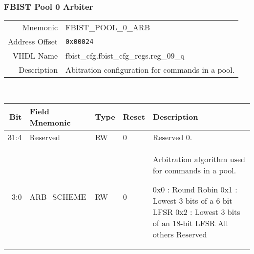 \subsubsection{FBIST Pool 0 Arbiter}
\begin{tabular}{ r | p{350px} }
  Mnemonic       & FBIST\_POOL\_0\_ARB                     \\
  Address Offset & \texttt{0x00024}                        \\
  VHDL Name      &  fbist\_cfg.fbist\_cfg\_regs.reg\_09\_q \\ \hline

  Description &
  Abitration configuration for commands in a pool. \\
\end{tabular}
\\
\begin{tabularx}{\textwidth}{r|l|l|l|X}
  \hline
  Bit   & Field Mnemonic & Type & Reset & Description \\ \hline

  31:4  & Reserved       & RW   & 0     &

  Reserved 0. \\

  3:0   & ARB\_SCHEME    & RW   & 0     &

  Arbitration algorithm used for commands in a pool.

  \setlength\parindent{24pt}
  \indent 0x0 : Round Robin                     \newline
  \indent 0x1 : Lowest 3 bits of a   6-bit LFSR \newline
  \indent 0x2 : Lowest 3 bits of an 18-bit LFSR \newline
  \indent All others Reserved                   \\
\end{tabularx}

